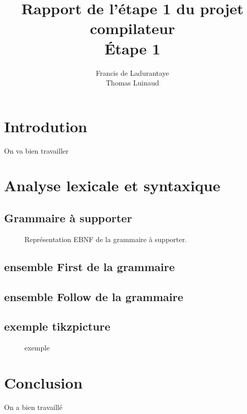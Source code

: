 \documentclass[12pt]{article}
\title{Rapport de l'étape 1 du projet compilateur \\ Étape 1}
\author{Francis de Ladurantaye \\ Thomas Luinaud}
\begin{document}
\begin{titlepage}
	\maketitle
\end{titlepage}


\section{Introdution}
On va bien travailler

\section{Analyse lexicale et syntaxique}

\subsection{Grammaire à supporter}

\begin{figure}[h!]
	
	\caption{Représentation EBNF de la grammaire à supporter.}
\end{figure}

\subsection{ensemble First de la grammaire}

\subsection{ensemble Follow de la grammaire}


\subsection{exemple tikzpicture}
\begin{figure}
	
	\caption{exemple}
\end{figure}


\section{Conclusion}
On a bien travaillé
\end{document}
